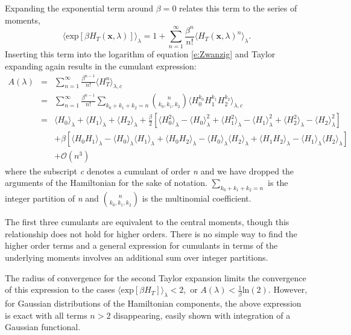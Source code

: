 \documentclass[%
 preprint,
 amsmath,amssymb,
 aps,
]{revtex4-1}
\renewcommand{\vec}[1]{{\mathbf{#1}}}
\begin{document}
Expanding the exponential term around $\beta=0$ relates this term to the series of moments,
\begin{equation}
 \langle \mbox{exp} \left[ \beta H_T (\vec{x},\lambda) \right]  \rangle_{\lambda} = 
 1+\sum_{n=1}^{\infty}  \frac{\beta^n}{n!} \langle  H_T (\vec{x},\lambda)^n \rangle_{\lambda}.
\label{e:Taylor1}
\end{equation}
Inserting this term into the logarithm of equation \ref{e:Zwanzig} and Taylor expanding again results in the cumulant 
expression:
\begin{eqnarray}
A (\lambda) &=& \sum_{n=1}^{\infty}  \frac{\beta^{n-1}}{n!} \langle  H_T^n \rangle_{\lambda,c} \\
& = &
\sum_{n=1}^{\infty}  \frac{\beta^{n-1}}{n!}  \sum_{k_0+k_1+k_2=n} 
{ n \choose k_0,k_1,k_2 } \langle  H_0^{k_0} H_1^{k_1} H_2^{k_2} \rangle_{\lambda,c} \\
& = &
\langle  H_0 \rangle_{\lambda}  + \langle  H_1 \rangle_{\lambda} + \langle  H_2 \rangle_{\lambda}  
+ \frac{\beta}{2} \left[  \langle  H_0^2 \rangle_{\lambda} -\langle  H_0 \rangle^2_{\lambda}  +
\langle  H_1^2 \rangle_{\lambda} -\langle  H_1 \rangle^2_{\lambda}  
 + \langle  H_2^2 \rangle_{\lambda} -\langle  H_2 \rangle^2_{\lambda}   \right] 
\\ 
 & & 
 + \beta \left[ \langle  H_0 H_1\rangle_{\lambda} -\langle  H_0 \rangle_{\lambda} \langle  H_1 \rangle_{\lambda} 
 +\langle  H_0 H_2\rangle_{\lambda} -\langle  H_0 \rangle_{\lambda} \langle  H_2 \rangle_{\lambda} 
 +\langle  H_1 H_2\rangle_{\lambda} -\langle  H_1 \rangle_{\lambda} \langle  H_2 \rangle_{\lambda} 
   \right]
  \\ & & 
 + \mathcal{O} (n^3)
\label{e:CumulantTot}
\end{eqnarray}
where the subscript \emph{c} denotes a cumulant of order \emph{n} and we have dropped the arguments of the Hamiltonian for the sake of notation.  $ \sum_{k_0+k_1+k_2=n} $ is the integer partition of \emph{n} and 
${ n \choose k_0,k_1,k_2 }$ is the multinomial coefficient.

The first three cumulants are equivalent to the central moments, though this relationship does not hold for higher orders.  There is no simple way to find the higher order terms and a general expression for cumulants in terms of the underlying moments involves an additional sum over integer partitions.\cite{NULL}

The radius of convergence for the second Taylor expansion limits the convergence of this expression to the cases  
$
\langle \mbox{exp} \left[ \beta H_T  \right]  \rangle_{\lambda} < 2,
$
or 
$
A (\lambda) < \frac{1}{\beta}\mbox{ln} (2)
$.  However, for Gaussian distributions of the Hamiltonian components, the above expression is exact with all terms $n>2$ disappearing, easily shown with integration of a Gaussian functional. 
\end{document}
